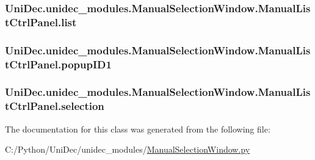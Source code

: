 \subsubsection[{list}]{\setlength{\rightskip}{0pt plus 5cm}Uni\+Dec.\+unidec\+\_\+modules.\+Manual\+Selection\+Window.\+Manual\+List\+Ctrl\+Panel.\+list}\label{class_uni_dec_1_1unidec__modules_1_1_manual_selection_window_1_1_manual_list_ctrl_panel_a95e6e9762f5c7ec73968f443706ba8c8}
\hypertarget{class_uni_dec_1_1unidec__modules_1_1_manual_selection_window_1_1_manual_list_ctrl_panel_aad92dda71ec9301eb1187f0e49c362df}{}
\subsubsection[{popup\+I\+D1}]{\setlength{\rightskip}{0pt plus 5cm}Uni\+Dec.\+unidec\+\_\+modules.\+Manual\+Selection\+Window.\+Manual\+List\+Ctrl\+Panel.\+popup\+I\+D1}\label{class_uni_dec_1_1unidec__modules_1_1_manual_selection_window_1_1_manual_list_ctrl_panel_aad92dda71ec9301eb1187f0e49c362df}
\hypertarget{class_uni_dec_1_1unidec__modules_1_1_manual_selection_window_1_1_manual_list_ctrl_panel_a54c1e8ccf97b547a212b752f07ef5afa}{}
\subsubsection[{selection}]{\setlength{\rightskip}{0pt plus 5cm}Uni\+Dec.\+unidec\+\_\+modules.\+Manual\+Selection\+Window.\+Manual\+List\+Ctrl\+Panel.\+selection}\label{class_uni_dec_1_1unidec__modules_1_1_manual_selection_window_1_1_manual_list_ctrl_panel_a54c1e8ccf97b547a212b752f07ef5afa}


The documentation for this class was generated from the following file\+:\begin{DoxyCompactItemize}
\item 
C\+:/\+Python/\+Uni\+Dec/unidec\+\_\+modules/\hyperlink{_manual_selection_window_8py}{Manual\+Selection\+Window.\+py}\end{DoxyCompactItemize}
